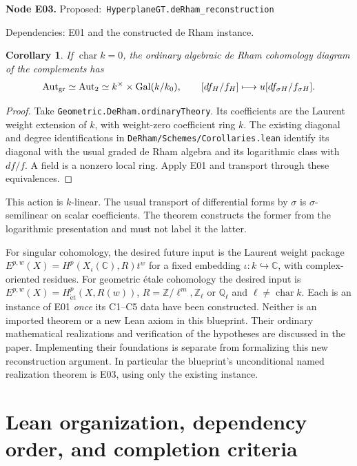\documentclass[11pt]{article}
\newtheorem{corollary}[theorem]{Corollary}
\theoremstyle{remark}\newtheorem{remark}[theorem]{Remark}
\newcommand{\Z}{\mathbb Z}
\newcommand{\Q}{\mathbb Q}
\newcommand{\C}{\mathbb C}
\newcommand{\Aut}{\operatorname{Aut}}
\newcommand{\Gal}{\operatorname{Gal}}
\newcommand{\code}[1]{\nolinkurl{#1}}
\newcommand{\node}[3]{\par\Needspace{8\baselineskip}\smallskip\noindent\textbf{Node #1.}\quad
 \textsf{Proposed:}\ \code{#2}\par\noindent
 \textsf{Dependencies:} #3.\par\smallskip}
\begin{document}
\node{E03}{HyperplaneGT.deRham_reconstruction}{E01 and the constructed de Rham instance}
\begin{corollary}\label{cor:e03}
If $\operatorname{char}k=0$, the ordinary algebraic de Rham
cohomology diagram of the complements has
\[
 \Aut_{\rm gr}\simeq\Aut_2\simeq
 k^\times\times\Gal(k/k_0),
 \qquad [df_H/f_H]\longmapsto u[df_{\sigma H}/f_{\sigma H}].
\]
\end{corollary}
\begin{proof}
Take \code{Geometric.DeRham.ordinaryTheory}. Its coefficients
are the Laurent weight extension of $k$, with weight-zero
coefficient ring $k$. The existing diagonal and degree
identifications in \code{DeRham/Schemes/Corollaries.lean}
identify its diagonal with the usual graded de Rham algebra
and its logarithmic class with $df/f$. A field is a nonzero
local ring. Apply E01 and transport through these equivalences.
\end{proof}
This action is $k$-linear. The usual transport of differential
forms by $\sigma$ is $\sigma$-semilinear on scalar coefficients.
The theorem constructs the former from the logarithmic
presentation and must not label it the latter.

For singular cohomology, the desired future input is the
Laurent weight package
$E^{p,w}(X)=H^p(X_\iota(\C),R)t^w$ for a fixed embedding
$\iota:k\hookrightarrow\C$, with complex-oriented residues.
For geometric \'etale cohomology the desired input is
$E^{p,w}(X)=H^p_{\mathrm{\acute et}}(X,R(w))$,
$R=\Z/\ell^m,\Z_\ell$ or $\Q_\ell$ and
$\ell\ne\operatorname{char}k$. Each is an instance of E01
\emph{once} its C1--C5 data have been constructed. Neither is
an imported theorem or a new Lean axiom in this blueprint.
Their ordinary mathematical realizations and verification of
the hypotheses are discussed in the paper. Implementing their
foundations is separate from formalizing this new reconstruction
argument. In particular the blueprint's unconditional named
realization theorem is E03, using only the existing instance.

\section{Lean organization, dependency order, and completion criteria}
\end{document}
